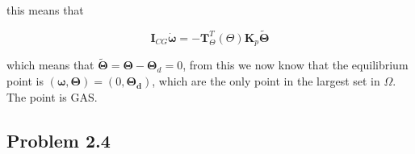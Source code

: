 this means that

\begin{equation}
\boldsymbol{I}_{CG}\dot{\boldsymbol{\omega}} = -\boldsymbol{T}_{\Theta}^T(\Theta)\boldsymbol{K}_p\tilde{\boldsymbol{\Theta}}
\end{equation}

which means that $\tilde{\boldsymbol{\Theta}}= \boldsymbol{\Theta}- \boldsymbol{\Theta}_d = 0$,
from this we now know that the equilibrium point is $(\boldsymbol{\omega},\boldsymbol{\Theta}) = (0,\boldsymbol{\Theta_d})$, which are the only point in the largest set in $\Omega$. The point is GAS. 

\subsection*{Problem 2.4}


